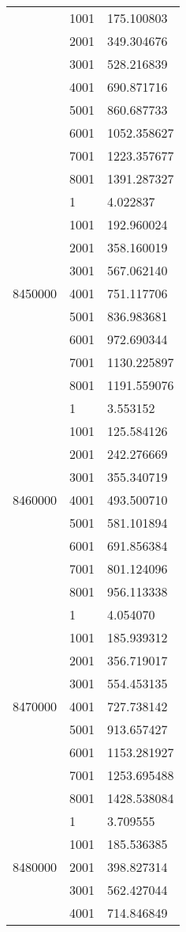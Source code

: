 \begin{table}[htb!]
\begin{tabular}{lll}
 & 1001 & 175.100803 \\
 & 2001 & 349.304676 \\
 & 3001 & 528.216839 \\
 & 4001 & 690.871716 \\
 & 5001 & 860.687733 \\
 & 6001 & 1052.358627 \\
 & 7001 & 1223.357677 \\
 & 8001 & 1391.287327 \\
\multirow[c]{9}{*}{8450000} & 1 & 4.022837 \\
 & 1001 & 192.960024 \\
 & 2001 & 358.160019 \\
 & 3001 & 567.062140 \\
 & 4001 & 751.117706 \\
 & 5001 & 836.983681 \\
 & 6001 & 972.690344 \\
 & 7001 & 1130.225897 \\
 & 8001 & 1191.559076 \\
\multirow[c]{9}{*}{8460000} & 1 & 3.553152 \\
 & 1001 & 125.584126 \\
 & 2001 & 242.276669 \\
 & 3001 & 355.340719 \\
 & 4001 & 493.500710 \\
 & 5001 & 581.101894 \\
 & 6001 & 691.856384 \\
 & 7001 & 801.124096 \\
 & 8001 & 956.113338 \\
\multirow[c]{9}{*}{8470000} & 1 & 4.054070 \\
 & 1001 & 185.939312 \\
 & 2001 & 356.719017 \\
 & 3001 & 554.453135 \\
 & 4001 & 727.738142 \\
 & 5001 & 913.657427 \\
 & 6001 & 1153.281927 \\
 & 7001 & 1253.695488 \\
 & 8001 & 1428.538084 \\
\multirow[c]{9}{*}{8480000} & 1 & 3.709555 \\
 & 1001 & 185.536385 \\
 & 2001 & 398.827314 \\
 & 3001 & 562.427044 \\
 & 4001 & 714.846849 \\

\end{tabular}
\end{table}
